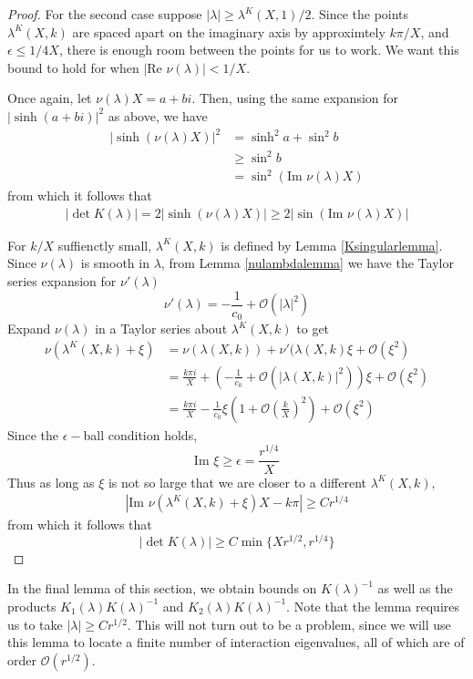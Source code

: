 \documentclass[thesis.tex]{subfiles}
\begin{document}
\begin{lemma}
\begin{proof}
For the second case suppose $|\lambda| \geq \lambda^K(X,1)/2$. Since the points $\lambda^K(X,k)$ are spaced apart on the imaginary axis by approximtely $k \pi/X$, and $\epsilon \leq 1/4X$, there is enough room between the points for us to work. We want this bound to hold for when $|\text{Re } \nu(\lambda)| < 1/X$. 

Once again, let $\nu(\lambda) X = a + b i$. Then, using the same expansion for $|\sinh(a + b i)|^2$ as above, we have
\begin{align*}
|\sinh(\nu(\lambda) X)|^2 
&= \sinh^2 a + \sin^2 b \\
&\geq \sin^2 b \\
&= \sin^2 (\text{Im }\nu(\lambda)X)
\end{align*}
from which it follows that
\begin{align*}
|\det K(\lambda)| = 2 |\sinh(\nu(\lambda) X)| \geq 2|\sin(\text{Im }\nu(\lambda)X)|
\end{align*}

For $k/X$ suffienctly small, $\lambda^K(X, k)$ is defined by Lemma \ref{Ksingularlemma}. Since $\nu(\lambda)$ is smooth in $\lambda$, from Lemma \ref{nulambdalemma} we have the Taylor series expansion for $\nu'(\lambda)$
\[
\nu'(\lambda) = -\frac{1}{c_0} + \mathcal{O}(|\lambda|^2)
\]
Expand $\nu(\lambda)$ in a Taylor series about $\lambda^K(X, k)$ to get
\begin{align*}
\nu\left( \lambda^K(X, k) + \xi \right) &= \nu( \lambda(X, k) ) + \nu'(\lambda(X, k)\xi
+ \mathcal{O}(\xi^2) \\
&= \frac{k \pi i}{X} + \left( -\frac{1}{c_0} + \mathcal{O}(|\lambda(X, k)|^2) \right) \xi
+ \mathcal{O}(\xi^2) \\
&= \frac{k \pi i}{X} -\frac{1}{c_0}\xi \left( 1 + \mathcal{O} \left(\frac{k}{X}\right)^2 \right) + \mathcal{O}(\xi^2)
\end{align*}
Since the $\epsilon-$ball condition holds,
\[
\text{Im } \xi \geq \epsilon = \frac{r^{1/4}}{X}
\]
Thus as long as $\xi$ is not so large that we are closer to a different $\lambda^K(X, k)$,
\begin{align*}
|\text{Im } \nu\left( \lambda^K(X, k) + \xi \right)X - k \pi| \geq C r^{1/4}
\end{align*}
from which it follows that
\[
|\det K(\lambda)| \geq C \min\{ X r^{1/2}, r^{1/4} \}
\]
\end{proof}
\end{lemma}

In the final lemma of this section, we obtain bounds on $K(\lambda)^{-1}$ as well as the products $K_1(\lambda)K(\lambda)^{-1}$ and $K_2(\lambda)K(\lambda)^{-1}$. Note that the lemma requires us to take $|\lambda| \geq C r^{1/2}$. This will not turn out to be a problem, since we will use this lemma to locate a finite number of interaction eigenvalues, all of which are of order $\mathcal{O}(r^{1/2})$.
\end{document}
